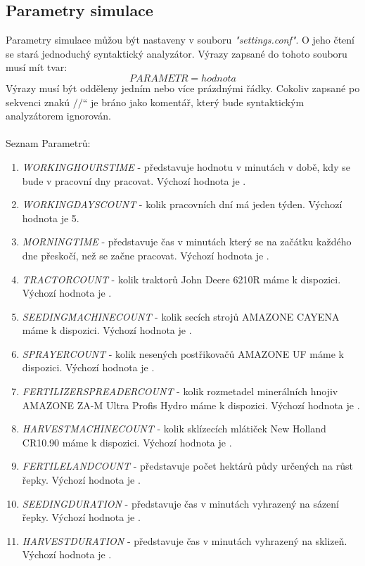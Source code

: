 \documentclass[11pt,a4paper,titlepage]{article}
\newcommand{\ceskeuvozovky}[1]{\quotedblbase#1\textquotedblleft}
\begin{document}
\pagebreak


\subsection{Parametry simulace}
Parametry simulace můžou být nastaveny v souboru \emph{"settings.conf"}. O jeho čtení se stará jednoduchý syntaktický analyzátor. Výrazy zapsané do tohoto souboru musí mít tvar: $$PARAMETR = hodnota$$ Výrazy musí být odděleny jedním nebo více prázdnými řádky. Cokoliv zapsané po sekvenci znakú \ceskeuvozovky{$//$} je bráno jako komentář, který bude syntaktickým analyzátorem ignorován.
\\ \\
Seznam Parametrů:
\begin{enumerate}
    \item{\emph{WORKINGHOURSTIME} - představuje hodnotu v minutách v době, kdy se bude v pracovní dny pracovat. Výchozí hodnota je .}
    \item{\emph{WORKINGDAYSCOUNT} - kolik pracovních dní má jeden týden. Výchozí hodnota je 5.}
    \item{\emph{MORNINGTIME} - představuje čas v minutách který se na začátku každého dne přeskočí, než se začne pracovat. Výchozí hodnota je .}
    \item{\emph{TRACTORCOUNT} - kolik traktorů John Deere 6210R máme k dispozici. Výchozí hodnota je .}
    \item{\emph{SEEDINGMACHINECOUNT} - kolik secích strojů AMAZONE CAYENA máme k dispozici. Výchozí hodnota je .}
    \item{\emph{SPRAYERCOUNT} - kolik nesených postřikovačů AMAZONE UF máme k dispozici. Výchozí hodnota je .}
    \item{\emph{FERTILIZERSPREADERCOUNT} - kolik rozmetadel minerálních hnojiv AMAZONE ZA-M Ultra Profis Hydro máme k dispozici. Výchozí hodnota je .}
    \item{\emph{HARVESTMACHINECOUNT} - kolik sklízecích mlátiček New Holland CR10.90 máme k dispozici. Výchozí hodnota je .}
    \item{\emph{FERTILELANDCOUNT} - představuje počet hektárů půdy určených na růst řepky. Výchozí hodnota je .}
    \item{\emph{SEEDINGDURATION} - představuje čas v minutách vyhrazený na sázení řepky. Výchozí hodnota je .}
    \item{\emph{HARVESTDURATION} - představuje čas v minutách vyhrazený na sklizeň. Výchozí hodnota je .}
\end{enumerate}
\end{document}
